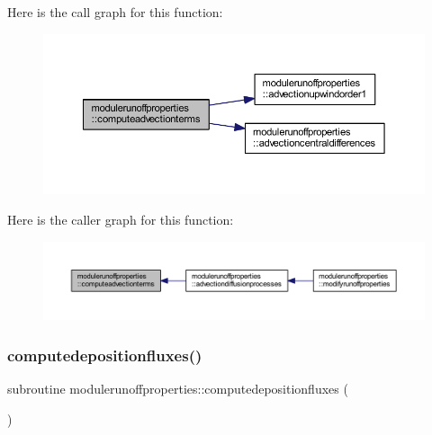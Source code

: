 Here is the call graph for this function\+:\nopagebreak
\begin{figure}[H]
\begin{center}
\leavevmode
\includegraphics[width=350pt]{namespacemodulerunoffproperties_a661de168b780c51098cc52f20f85f34b_cgraph}
\end{center}
\end{figure}
Here is the caller graph for this function\+:\nopagebreak
\begin{figure}[H]
\begin{center}
\leavevmode
\includegraphics[width=350pt]{namespacemodulerunoffproperties_a661de168b780c51098cc52f20f85f34b_icgraph}
\end{center}
\end{figure}
\mbox{\label{namespacemodulerunoffproperties_a8bbf07614377370c486122ce0f904d0d}} 
\subsubsection{\texorpdfstring{computedepositionfluxes()}{computedepositionfluxes()}}
{\footnotesize\ttfamily subroutine modulerunoffproperties\+::computedepositionfluxes (\begin{DoxyParamCaption}{ }\end{DoxyParamCaption})\hspace{0.3cm}{\ttfamily [private]}}

